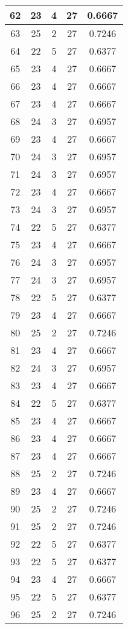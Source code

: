 \documentclass[letterpaper, 12pt]{article}
\begin{document}
\begin{longtable}{|c|c|c|c|c|}
\hline
62 & 23 & 4 & 27 & 0.6667 \\
\hline
63 & 25 & 2 & 27 & 0.7246 \\
\hline
64 & 22 & 5 & 27 & 0.6377 \\
\hline
65 & 23 & 4 & 27 & 0.6667 \\
\hline
66 & 23 & 4 & 27 & 0.6667 \\
\hline
67 & 23 & 4 & 27 & 0.6667 \\
\hline
68 & 24 & 3 & 27 & 0.6957 \\
\hline
69 & 23 & 4 & 27 & 0.6667 \\
\hline
70 & 24 & 3 & 27 & 0.6957 \\
\hline
71 & 24 & 3 & 27 & 0.6957 \\
\hline
72 & 23 & 4 & 27 & 0.6667 \\
\hline
73 & 24 & 3 & 27 & 0.6957 \\
\hline
74 & 22 & 5 & 27 & 0.6377 \\
\hline
75 & 23 & 4 & 27 & 0.6667 \\
\hline
76 & 24 & 3 & 27 & 0.6957 \\
\hline
77 & 24 & 3 & 27 & 0.6957 \\
\hline
78 & 22 & 5 & 27 & 0.6377 \\
\hline
79 & 23 & 4 & 27 & 0.6667 \\
\hline
80 & 25 & 2 & 27 & 0.7246 \\
\hline
81 & 23 & 4 & 27 & 0.6667 \\
\hline
82 & 24 & 3 & 27 & 0.6957 \\
\hline
83 & 23 & 4 & 27 & 0.6667 \\
\hline
84 & 22 & 5 & 27 & 0.6377 \\
\hline
85 & 23 & 4 & 27 & 0.6667 \\
\hline
86 & 23 & 4 & 27 & 0.6667 \\
\hline
87 & 23 & 4 & 27 & 0.6667 \\
\hline
88 & 25 & 2 & 27 & 0.7246 \\
\hline
89 & 23 & 4 & 27 & 0.6667 \\
\hline
90 & 25 & 2 & 27 & 0.7246 \\
\hline
91 & 25 & 2 & 27 & 0.7246 \\
\hline
92 & 22 & 5 & 27 & 0.6377 \\
\hline
93 & 22 & 5 & 27 & 0.6377 \\
\hline
94 & 23 & 4 & 27 & 0.6667 \\
\hline
95 & 22 & 5 & 27 & 0.6377 \\
\hline
96 & 25 & 2 & 27 & 0.7246 \\

\end{longtable}
\end{document}
